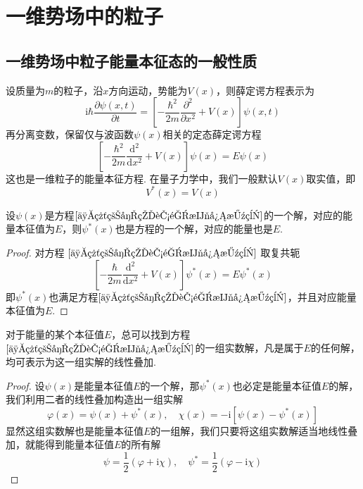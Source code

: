 \section{一维势场中的粒子}

\subsection{一维势场中粒子能量本征态的一般性质}

设质量为$m$的粒子，沿$x$方向运动，势能为$V(x)$，则薛定谔方程表示为
\begin{equation}\label{薛定谔方程}
    \mathrm{i}\hbar\frac{\partial \psi(x,t)}{\partial t} = \left[-\frac{\hbar^2}{2m}\frac{\partial^2 }{\partial x^2}+V(x)\right]\psi(x,t)
\end{equation}
再分离变数，保留仅与波函数$\psi(x)$相关的定态薛定谔方程
\begin{equation}\label{一维粒子的能量本征方程}
    \left[-\frac{\hbar^2}{2m}\frac{\mathrm{d}^2}{\mathrm{d}x^2}+V(x)\right]\psi(x)=E\psi(x)
\end{equation}
这也是一维粒子的能量本征方程. 在量子力学中，我们一般默认$V(x)$取实值，即
\begin{equation}\label{量子力学中的势能是实数}
    V^*(x) = V(x)
\end{equation}



\begin{theorem}\label{定理1}
    设$\psi(x)$是方程$\eqref{一维粒子的能量本征方程}$的一个解，对应的能量本征值为$E$，则$\psi^*(x)$也是方程的一个解，对应的能量也是$E$.
\end{theorem}
\begin{proof}
    对方程 $\eqref{一维粒子的能量本征方程}$ 取复共轭
    $$
        \left[-\frac{\hbar}{2m}\frac{\mathrm{d}^2}{\mathrm{d}x^2}+V(x)\right]\psi^*(x)=E\psi^*(x)
    $$
    即$\psi^*(x)$也满足方程$\eqref{一维粒子的能量本征方程}$，并且对应能量本征值为$E$.
\end{proof}





\begin{theorem}\label{定理2}
    对于能量的某个本征值$E$，总可以找到方程$\eqref{一维粒子的能量本征方程}$的一组实数解，凡是属于$E$的任何解，均可表示为这一组实解的线性叠加.
\end{theorem}
\begin{proof}
    设$\psi(x)$是能量本征值$E$的一个解，那$\psi^*(x)$也必定是能量本征值$E$的解，我们利用二者的线性叠加构造出一组实解
    $$
        \varphi(x)=\psi(x)+\psi^*(x), \quad
        \chi(x) = -\mathrm{i}[\psi(x)-\psi^*(x)]
    $$
    显然这组实数解也是能量本征值$E$的一组解，我们只要将这组实数解适当地线性叠加，就能得到能量本征值$E$的所有解
    $$
        \psi=\frac{1}{2}(\varphi+\mathrm{i}\chi), \quad
        \psi^*=\frac{1}{2}(\varphi-\mathrm{i}\chi)
    $$
\end{proof}



